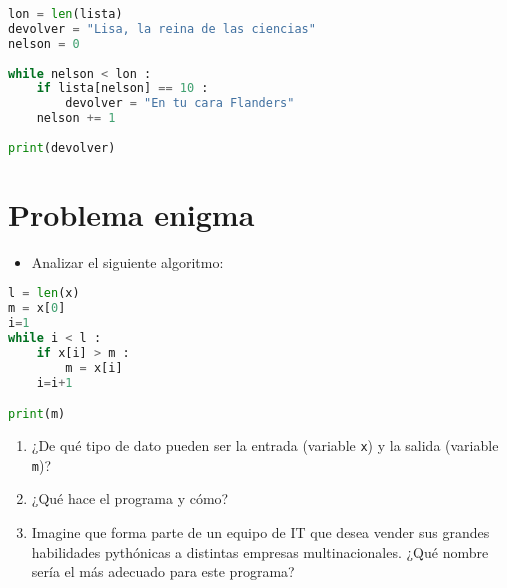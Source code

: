 \documentclass{article}
\begin{document}
\begin{lstlisting}[language=Python]
lon = len(lista)
devolver = "Lisa, la reina de las ciencias"
nelson = 0
    
while nelson < lon :
	if lista[nelson] == 10 :
		devolver = "En tu cara Flanders"
	nelson += 1
        
print(devolver)

\end{lstlisting}


\section{Problema enigma}
\begin{itemize}
    \item Analizar el siguiente algoritmo:
\end{itemize}
\begin{lstlisting}[language=Python]
l = len(x)
m = x[0]
i=1
while i < l :
	if x[i] > m :
		m = x[i]
	i=i+1

print(m)

\end{lstlisting}
\begin{enumerate}
    \item ¿De qué tipo de dato pueden ser la entrada (variable \texttt{x}) y la salida (variable \texttt{m})?
    \item ¿Qué hace el programa y cómo?
    \item Imagine que forma parte de un equipo de IT que desea vender sus grandes habilidades pythónicas a distintas empresas multinacionales. ¿Qué nombre sería el más adecuado para este programa?
\end{enumerate}
\end{document}
